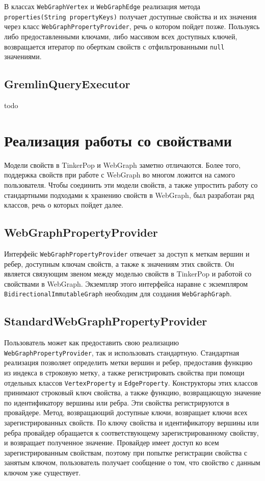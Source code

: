 \documentclass[times,specification,annotation]{itmo-student-thesis}
\begin{document}
В классах \texttt{WebGraphVertex} и \texttt{WebGraphEdge} реализация метода \texttt{properties(String propertyKeys)} получает доступные свойства и их значения через класс \texttt{WebGraphPropertyProvider}, речь о котором пойдет позже. Пользуясь либо предоставленными ключами, либо массивом всех доступных ключей, возвращается итератор по оберткам свойств с отфильтрованными \texttt{null} значениями.

\subsection{GremlinQueryExecutor}

todo

\section{Реализация работы со свойствами}

Модели свойств в TinkerPop и WebGraph заметно отличаются. Более того, поддержка свойств при работе с WebGraph во многом ложится на самого пользователя. Чтобы соединить эти модели свойств, а также упростить работу со стандартными подходами к хранению свойств в WebGraph, был разработан ряд классов, речь о которых пойдет далее.

\subsection{WebGraphPropertyProvider}

Интерфейс \texttt{WebGraphPropertyProvider} отвечает за доступ к меткам вершин и ребер, доступным ключам свойств, а также к значениям этих свойств. Он является связующим звеном между моделью свойств в TinkerPop и работой со свойствами в WebGraph. Экземпляр этого интерфейса наравне с экземпляром \texttt{BidirectionalImmutableGraph} необходим для создания \texttt{WebGraphGraph}.

\subsection{StandardWebGraphPropertyProvider}

Пользователь может как предоставить свою реализацию \texttt{WebGraphPropertyProvider}, так и использовать стандартную. Стандартная реализация позволяет определить метки вершин и ребер, предоставив функцию из индекса в строковую метку, а также регистрировать свойства при помощи отдельных классов \texttt{VertexProperty} и \texttt{EdgeProperty}. Конструкторы этих классов принимают строковый ключ свойства, а также функцию, возвращающую значение по идентификатору вершины или ребра.
Эти свойства регистрируются в провайдере. Метод, возвращающий доступные ключи, возвращает ключи всех зарегистрированных свойств. По ключу свойства и идентификатору вершины или ребра провайдер обращается к соответствующему зарегистрированному свойству, и возвращает полученное значение. Провайдер имеет доступ ко всем зарегистрированным свойствам, поэтому при попытке регистрации свойства с занятым ключом, пользователь получает сообщение о том, что свойство с данным ключом уже существует.
\end{document}
